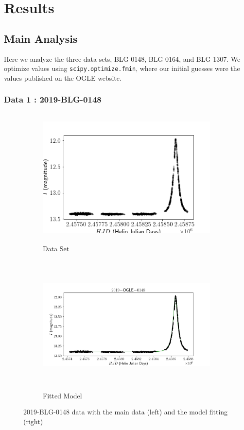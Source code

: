 \documentclass{article}
\begin{document}
\section{Results}
\subsection{Main Analysis}
Here we analyze the three data sets, BLG-0148, BLG-0164, and BLG-1307. We optimize values using \texttt{scipy.optimize.fmin}, where our initial guesses were the values published on the OGLE website.
\subsubsection{Data 1 : 2019-BLG-0148}
        \begin{figure}[H]
            \begin{subfigure}{0.5\textwidth}
                \includegraphics[width=1\linewidth, height=7cm]{Images/2019-BLG-148_Original_Data.png} 
                \caption{Data Set}
                \label{fig:Sub-Event-One-Main}
            \end{subfigure}
            \begin{subfigure}{0.5\textwidth}
                \includegraphics[width=1\linewidth, height=7cm]{Images/2019-BLG-0148_Original_Data_Model_fitted.png}
                \caption{Fitted Model}
                \label{fig:Sub-Event-One-Alt}
            \end{subfigure}
        \caption{2019-BLG-0148 data with the main data (left) and the model fitting (right)}
        \label{fig:image2}
        \end{figure}
    
\end{document}
